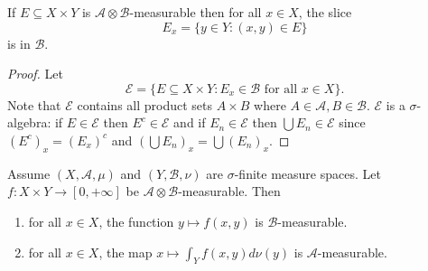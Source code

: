 \documentclass[a4paper]{article}
\begin{document}
\begin{lemma}
  If \(E \subseteq X \times Y\) is \(\mathcal A \otimes \mathcal B\)-measurable then for all \(x \in X\), the slice
  \[
    E_x = \{y \in Y: (x, y) \in E\}
  \]
  is in \(\mathcal B\).
\end{lemma}

\begin{proof}
  Let
  \[
    \mathcal E = \{E \subseteq X \times Y: E_x \in \mathcal B \text{ for all } x \in X\}.
  \]
  Note that \(\mathcal E\) contains all product sets \(A \times B\) where \(A \in \mathcal A, B \in \mathcal B\). \(\mathcal E\) is a \(\sigma\)-algebra: if \(E \in \mathcal E\) then \(E^c \in \mathcal E\) and if \(E_n \in \mathcal E\) then \(\bigcup E_n \in \mathcal E\) since \((E^c)_x = (E_x)^c\) and \((\bigcup E_n)_x = \bigcup (E_n)_x\).
\end{proof}

\begin{lemma}
  Assume \((X, \mathcal A, \mu)\) and \((Y, \mathcal B, \nu)\) are \(\sigma\)-finite measure spaces. Let \(f: X \times Y \to [0, +\infty]\) be \(\mathcal A \otimes \mathcal B\)-measurable. Then
  \begin{enumerate}
  \item for all \(x \in X\), the function \(y \mapsto f(x, y)\) is \(\mathcal B\)-measurable.
  \item for all \(x \in X\), the map \(x \mapsto \int_Y f(x, y) d\nu(y)\) is \(\mathcal A\)-measurable.
  \end{enumerate}
\end{lemma}
\end{document}
